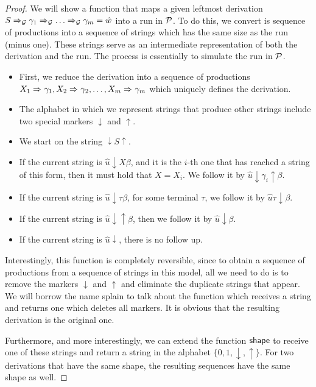 \begin{proof}
We will show a function that maps a given leftmost derivation $S\Rightarrow_{\mathcal{G}} \gamma_1\Rightarrow_{\mathcal{G}}\ldots\Rightarrow_{\mathcal{G}}\gamma_m = \hat{w}$ into a run in $\mathcal{P}$. To do this, we convert is sequence of productions into a sequence of strings which has the same size as the run (minus one). These strings serve as an intermediate representation of both the derivation and the run. The process is essentially to simulate the run in $\mathcal{P}$.
\begin{itemize}
	\item First, we reduce the derivation into a sequence of productions $X_1\Rightarrow_{}\gamma_1, X_2\Rightarrow_{}\gamma_2,\ldots, X_m\Rightarrow_{}\gamma_m$ which uniquely defines the derivation. 
	\item The alphabet in which we represent strings that produce other strings include two special markers $\downarrow$ and $\uparrow$.
	\item We start on the string $\downarrow S\uparrow$.
	\item If the current string is $\hat{u} \downarrow X \beta$, and it is the $i$-th one that has reached a string of this form, then it must hold that $X = X_i$. We follow it by $\hat{u} \downarrow \gamma_i\uparrow\beta$.
	\item If the current string is $\hat{u}\downarrow \tau\beta$, for some terminal $\tau$, we follow it by $\hat{u} \tau \downarrow \beta$.
	\item If the current string is $\hat{u}\downarrow\uparrow\beta$, then we follow it by $\hat{u}\downarrow\beta$.
	\item If the current string is $\hat{u}\downarrow$, there is no follow up.
\end{itemize}
Interestingly, this function is completely reversible, since to obtain a sequence of productions from a sequence of strings in this model, all we need to do is to remove the markers 
$\downarrow$ and $\uparrow$ and eliminate the duplicate strings that appear.
We will borrow the name splain to talk about the function which receives a string and returns one which deletes all markers. 
It is obvious that the resulting derivation is the original one. 

Furthermore, and more interestingly, we can extend the function $\mathsf{shape}$ to receive one of these strings and return a string in the alphabet $\{0, 1, \downarrow, \uparrow\}$. For two derivations that have the same shape, the resulting sequences have the same shape as well.


\end{proof}
